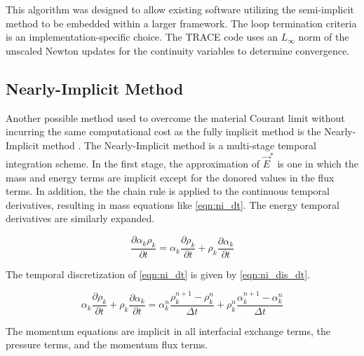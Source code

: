 This algorithm was designed to allow existing software utilizing the semi-implicit method to be embedded within a larger framework.
The loop termination criteria is an implementation-specific choice.
The TRACE code uses an $L_{\infty}$ norm of the unscaled Newton updates for the continuity variables to determine convergence.

\subsection{Nearly-Implicit Method}
\label{subsect:numerics_nearly_implicit}
Another possible method used to overcome the material Courant limit without incurring the same computational cost as the fully implicit method is the Nearly-Implicit method \cite{Trapp1986, RELAP}.
The Nearly-Implicit method is a multi-stage temporal integration scheme.
In the first stage, the approximation  of $\vec{E}^{*}$ is one in which the mass and energy terms are implicit except for the donored values in the flux terms. 
In addition, the the chain rule is applied to the continuous temporal derivatives, resulting in mass equations like \eqref{eqn:ni_dt}.
The energy temporal derivatives are similarly expanded.

\begin{equation}
\label{eqn:ni_dt}
\frac{\partial \alpha_k \rho_k}{\partial t} = \alpha_k \frac{\partial \rho_k}{\partial t} + \rho_k \frac{\partial \alpha_k}{\partial t}
\end{equation}

The temporal discretization of \eqref{eqn:ni_dt} is given by \eqref{eqn:ni_dis_dt}.

\begin{equation}
\label{eqn:ni_dis_dt}
\alpha_k \frac{\partial \rho_k}{\partial t} + \rho_k \frac{\partial \alpha_k}{\partial t} = \alpha^n_k\frac{ \rho^{n+1}_k - \rho^{n}_k}{\Delta t} + \rho^{n}_k\frac{\alpha^{n+1}_k - \alpha^{n}_k}{\Delta t}
\end{equation}

The momentum equations are implicit in all interfacial exchange terms, the pressure terms, and the momentum flux terms.

